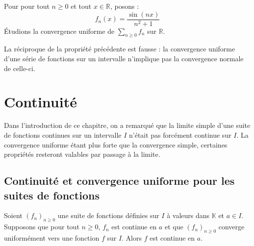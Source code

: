\documentclass[french,11pt,twoside]{VcCours}
\begin{document}
\begin{Exemple} Pour pour tout $n \geq 0$ et tout $x \in \mathbb{R}$, posons :
$$ f_n(x) = \frac{\sin(nx)}{n^2+1}$$
Étudions la convergence uniforme de $\sum_{n \geq 0} f_n$ sur $\mathbb{R}$.


%

\vspace*{7cm}
\end{Exemple}

\begin{Remarque}{} La réciproque de la propriété précédente est fausse : la convergence uniforme d'une série de fonctions sur un intervalle n'implique pas la convergence normale de celle-ci.
\end{Remarque}

\section{Continuité}

Dans l'introduction de ce chapitre, on a remarqué que la limite simple d'une suite de fonctions continues sur un intervalle $I$ n'était pas forcément continue sur $I$. La convergence uniforme étant plus \og forte \fg que la convergence simple, certaines propriétés resteront valables par passage à la limite.

\subsection{Continuité et convergence uniforme pour les suites de fonctions}

\begin{Theoreme}{}\label{segment}
Soient $(f_n)_{n \geq 0}$ une suite de fonctions définies sur $I$ à valeurs dans $\mathbb{K}$ et $a \in I$. Supposons que pour tout $n \geq 0$, $f_n$ est continue en $a$ et que $(f_n)_{n \geq 0}$ converge uniformément vers une fonction $f$ sur $I$. Alors $f$ est continue en $a$.
\end{Theoreme}
\end{document}
